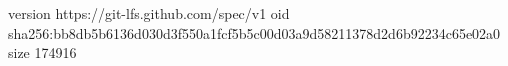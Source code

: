 version https://git-lfs.github.com/spec/v1
oid sha256:bb8db5b6136d030d3f550a1fcf5b5c00d03a9d58211378d2d6b92234c65e02a0
size 174916
